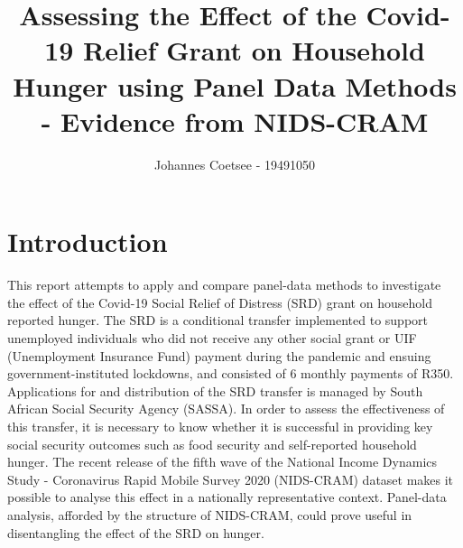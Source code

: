 \documentclass[11pt,preprint, authoryear]{elsarticle}
\numberwithin{equation}{section}
\numberwithin{figure}{section}
\numberwithin{table}{section}
\begin{document}
\begin{frontmatter}  %

\title{Assessing the Effect of the Covid-19 Relief Grant on Household Hunger
using Panel Data Methods - Evidence from NIDS-CRAM}





\author[Add1]{Johannes Coetsee - 19491050}





\address[Add1]{Stellenbosch University}



\vspace{1cm}


\vspace{0.5cm}
\end{frontmatter}



\pagestyle{fancy}
\chead{}
\lfoot{}
\lhead{}
\cfoot{}


\headsep 35pt %




\hypertarget{introduction}{%
\section{\texorpdfstring{Introduction
\label{Introduction}}{Introduction }}\label{introduction}}

This report attempts to apply and compare panel-data methods to
investigate the effect of the Covid-19 Social Relief of Distress (SRD)
grant on household reported hunger. The SRD is a conditional transfer
implemented to support unemployed individuals who did not receive any
other social grant or UIF (Unemployment Insurance Fund) payment during
the pandemic and ensuing government-instituted lockdowns, and consisted
of 6 monthly payments of R350. Applications for and distribution of the
SRD transfer is managed by South African Social Security Agency (SASSA).
In order to assess the effectiveness of this transfer, it is necessary
to know whether it is successful in providing key social security
outcomes such as food security and self-reported household hunger. The
recent release of the fifth wave of the National Income Dynamics Study -
Coronavirus Rapid Mobile Survey 2020 (NIDS-CRAM) dataset makes it
possible to analyse this effect in a nationally representative context.
Panel-data analysis, afforded by the structure of NIDS-CRAM, could prove
useful in disentangling the effect of the SRD on hunger.
\end{document}
